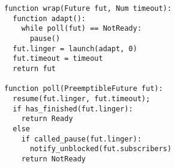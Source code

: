 \begin{figure}
\begin{lstlisting}[label=lst:future,caption=Making and polling preemptible futures]
function wrap(Future fut, Num timeout):
  function adapt():
    while poll(fut) == NotReady:
      pause()
  fut.linger = launch(adapt, 0)
  fut.timeout = timeout
  return fut

function poll(PreemptibleFuture fut):
  resume(fut.linger, fut.timeout);
  if has_finished(fut.linger):
    return Ready
  else
    if called_pause(fut.linger):
      notify_unblocked(fut.subscribers)
    return NotReady
\end{lstlisting}
\end{figure}
